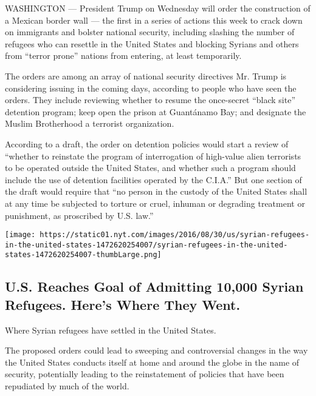 WASHINGTON --- President Trump on Wednesday will order the construction
of a Mexican border wall --- the first in a series of actions this week
to crack down on immigrants and bolster national security, including
slashing the number of refugees who can resettle in the United States
and blocking Syrians and others from ``terror prone'' nations from
entering, at least temporarily.

The orders are among an array of national security directives Mr. Trump
is considering issuing in the coming days, according to people who have
seen the orders. They include reviewing whether to resume the
once-secret ``black site'' detention program; keep open the prison at
Guantánamo Bay; and designate the Muslim Brotherhood a terrorist
organization.

According to a draft, the order on detention policies would start a
review of ``whether to reinstate the program of interrogation of
high-value alien terrorists to be operated outside the United States,
and whether such a program should include the use of detention
facilities operated by the C.I.A.'' But one section of the draft would
require that ``no person in the custody of the United States shall at
any time be subjected to torture or cruel, inhuman or degrading
treatment or punishment, as proscribed by U.S. law.''

\href{https://www.nytimes.com/interactive/2016/08/30/us/syrian-refugees-in-the-united-states.html}{}

\texttt{[image: https://static01.nyt.com/images/2016/08/30/us/syrian-refugees-in-the-united-states-1472620254007/syrian-refugees-in-the-united-states-1472620254007-thumbLarge.png]}

\hypertarget{us-reaches-goal-of-admitting-10000-syrian-refugees-heres-where-they-went}{%
\subsection{U.S. Reaches Goal of Admitting 10,000 Syrian Refugees.
Here's Where They
Went.}\label{us-reaches-goal-of-admitting-10000-syrian-refugees-heres-where-they-went}}

Where Syrian refugees have settled in the United States.

The proposed orders could lead to sweeping and controversial changes in
the way the United States conducts itself at home and around the globe
in the name of security, potentially leading to the reinstatement of
policies that have been repudiated by much of the world.

